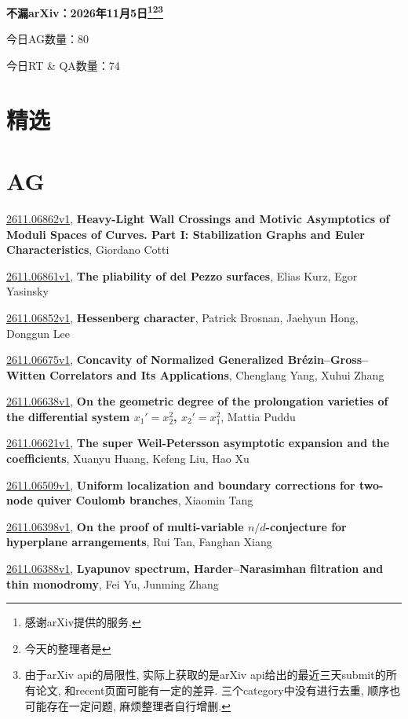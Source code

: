 \documentclass[9pt, a4paper]{article}
\theoremstyle{plain}
\theoremstyle{definition}
\theoremstyle{remark}
\newcommand{\arxiv}[3]{\href{https://arxiv.org/abs/#1}{#1}, \textbf{\textcolor{arxivblue}{#2}}, #3}
\newcommand{\AGnumber}{80}
\newcommand{\RTQAnumber}{74}
\newcommand{\NewestDate}{2026年11月5日}
\newcommand{\todayarXiver}{} %
\begin{document}
\begin{center}
    \Huge\textbf{不漏arXiv：\NewestDate\footnote{感谢arXiv提供的服务.}\footnote{今天的整理者是\todayarXiver}\footnote{由于arXiv api的局限性, 实际上获取的是arXiv api给出的最近三天submit的所有论文, 和recent页面可能有一定的差异. 三个category中没有进行去重, 顺序也可能存在一定问题, 麻烦整理者自行增删.}} \\
\end{center}

\setcounter{section}{-1}

\begin{center}
    今日AG数量：\AGnumber
    
    今日RT \& QA数量：\RTQAnumber
    
\end{center}


\section{精选}


\section{AG}
\arxiv{2611.06862v1}{Heavy-Light Wall Crossings and Motivic Asymptotics of Moduli Spaces of Curves. Part I: Stabilization Graphs and Euler Characteristics}{Giordano Cotti}

\arxiv{2611.06861v1}{The pliability of del Pezzo surfaces}{Elias Kurz, Egor Yasinsky}

\arxiv{2611.06852v1}{Hessenberg character}{Patrick Brosnan, Jaehyun Hong, Donggun Lee}

\arxiv{2611.06675v1}{Concavity of Normalized Generalized Brézin--Gross--Witten Correlators and Its Applications}{Chenglang Yang, Xuhui Zhang}

\arxiv{2611.06638v1}{On the geometric degree of the prolongation varieties of the differential system $x_1'=x_2^2$, $x_2'=x_1^2$}{Mattia Puddu}

\arxiv{2611.06621v1}{The super Weil-Petersson asymptotic expansion and the coefficients}{Xuanyu Huang, Kefeng Liu, Hao Xu}

\arxiv{2611.06509v1}{Uniform localization and boundary corrections for two-node quiver Coulomb branches}{Xiaomin Tang}

\arxiv{2611.06398v1}{On the proof of multi-variable $n/d$-conjecture for hyperplane arrangements}{Rui Tan, Fanghan Xiang}

\arxiv{2611.06388v1}{Lyapunov spectrum, Harder--Narasimhan filtration and thin monodromy}{Fei Yu, Junming Zhang}
\end{document}
